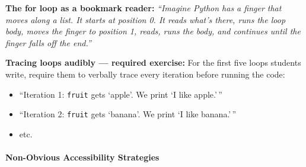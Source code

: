 \documentclass[
  justified,
  openright,
]{tufte-book}
\let\paragraph\paragraph
\let\paragraph\paragraph
\providecommand{\tightlist}{%
  \setlength{\itemsep}{0pt}\setlength{\parskip}{0pt}}
\begin{document}
\textbf{The for loop as a bookmark reader:} \emph{``Imagine Python has a
finger that moves along a list. It starts at position 0. It reads what's
there, runs the loop body, moves the finger to position 1, reads, runs
the body, and continues until the finger falls off the end.''}

\textbf{Tracing loops audibly --- required exercise:} For the first five
loops students write, require them to verbally trace every iteration
before running the code:

\begin{itemize}
\tightlist
\item
  ``Iteration 1: \texttt{fruit} gets `apple'. We print `I like
  apple.'\,''
\item
  ``Iteration 2: \texttt{fruit} gets `banana'. We print `I like
  banana.'\,''
\item
  etc.
\end{itemize}

\paragraph{Non-Obvious Accessibility
Strategies}\label{non-obvious-accessibility-strategies-1}
\end{document}
